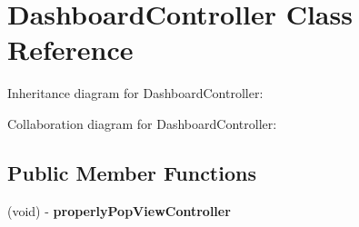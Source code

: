 \hypertarget{interface_dashboard_controller}{
\section{\-Dashboard\-Controller \-Class \-Reference}
\label{interface_dashboard_controller}
}


\-Inheritance diagram for \-Dashboard\-Controller\-:


\-Collaboration diagram for \-Dashboard\-Controller\-:
\subsection*{\-Public \-Member \-Functions}
\begin{DoxyCompactItemize}
\item 
\hypertarget{interface_dashboard_controller_a5c785fdeff353f92d3da5dd959b9372c}{
(void) -\/ {\bfseries properly\-Pop\-View\-Controller}}
\label{interface_dashboard_controller_a5c785fdeff353f92d3da5dd959b9372c}

\end{DoxyCompactItemize}
